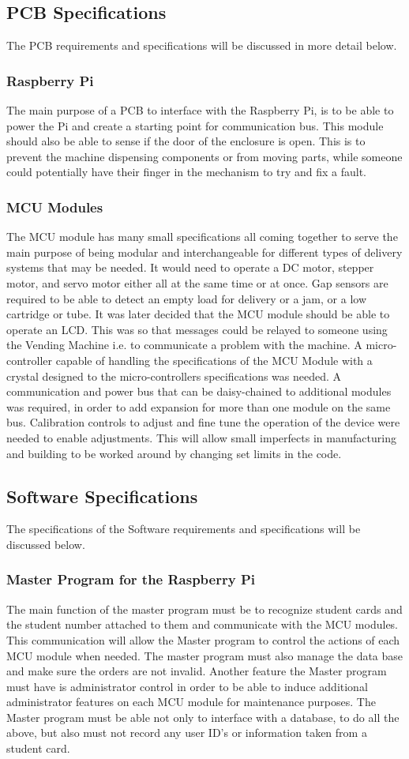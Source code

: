 \documentclass[a4paper,11pt]{article}
\numberwithin{figure}{section}
\numberwithin{table}{section}
\begin{document}
\subsection{PCB Specifications}
The PCB requirements and specifications will be discussed in more detail below.
\subsubsection{Raspberry Pi}
The main purpose of a PCB to interface with the Raspberry Pi, is to be able to power the Pi and create a starting point for communication bus. This module should also be able to sense if the door of the enclosure is open. This is to prevent the machine dispensing components or from moving parts, while someone could potentially have their finger in the mechanism to try and fix a fault. 
\subsubsection{MCU Modules}
The MCU module has many small specifications all coming together to serve the main purpose of being modular and interchangeable for different types of delivery systems that may be needed. It would need to operate a DC motor, stepper motor, and servo motor either all at the same time or at once. Gap sensors are required to be able to detect an empty load for delivery or a jam, or a low cartridge or tube. It was later decided that the MCU module should be able to operate an LCD. This was so that messages could be relayed to someone using the Vending Machine i.e. to communicate a problem with the machine. A micro-controller capable of handling the specifications of the MCU Module with a crystal designed to the micro-controllers specifications was needed. A communication and power bus that can be daisy-chained to additional modules was required, in order to add expansion for more than one module on the same bus. Calibration controls to adjust and fine tune the operation of the device were needed to enable adjustments. This will allow small imperfects in manufacturing and building to be worked around by changing set limits in the code.
\subsection{Software Specifications}
The specifications of the Software requirements and specifications will be discussed below.
\subsubsection{Master Program for the Raspberry Pi}
The main function of the master program must be to recognize student cards and the student number attached to them and communicate with the MCU modules. This communication will allow the Master program to control the actions of each MCU module when needed. The master program must also manage the data base and make sure the orders are not invalid. Another feature the Master program must have is administrator control in order to be able to induce additional administrator features on each MCU module for maintenance purposes. The Master program must be able not only to interface with a database, to do all the above, but also must not record any user ID's or information taken from a student card.
\end{document}

